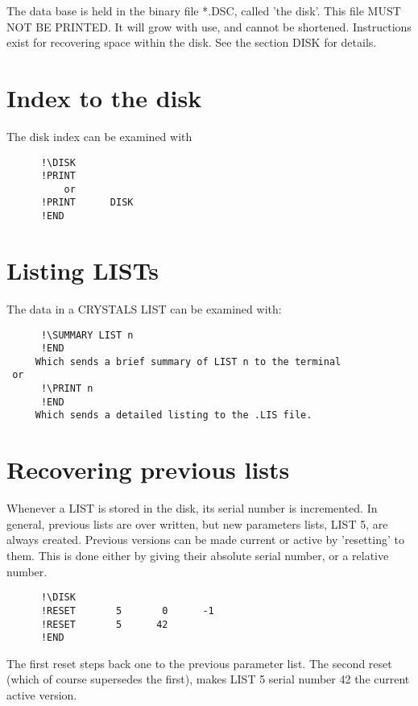 \documentclass[10pt,a4paper]{report}
\begin{document}
The data base is held in the binary file *.DSC, called 'the disk'. This file MUST NOT BE PRINTED. It will grow with use, and cannot be shortened. Instructions exist for recovering space within the disk. See the section DISK for details.

\section{Index to the disk}


The disk index can be examined with

\small\begin{verbatim}
      !\DISK
      !PRINT
          or
      !PRINT      DISK
      !END
\end{verbatim}\normalsize





\section{Listing LISTs}


The data in a CRYSTALS LIST can be examined with:

\small\begin{verbatim}
      !\SUMMARY LIST n
      !END
     Which sends a brief summary of LIST n to the terminal
 or
      !\PRINT n
      !END
     Which sends a detailed listing to the .LIS file.
\end{verbatim}\normalsize





\section{Recovering previous lists}


Whenever a LIST is stored in the disk, its serial number is incremented.
 In general, previous lists are over written, but new parameters lists,
 LIST 5, are always created. Previous versions can be made current or
 active by 'resetting' to them. This is done either by giving their
 absolute serial number, or a relative number.


\small\begin{verbatim}
      !\DISK
      !RESET       5       0      -1
      !RESET       5      42
      !END
\end{verbatim}\normalsize




The first reset steps back one to the previous parameter list. The second
 reset (which of course supersedes the first), makes LIST 5 serial number 42
 the current active version.
\end{document}
